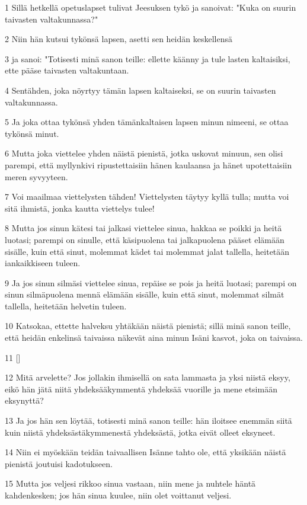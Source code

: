 \par 1 Sillä hetkellä opetuslapset tulivat Jeesuksen tykö ja sanoivat: "Kuka on suurin taivasten valtakunnassa?"
\par 2 Niin hän kutsui tykönsä lapsen, asetti sen heidän keskellensä
\par 3 ja sanoi: "Totisesti minä sanon teille: ellette käänny ja tule lasten kaltaisiksi, ette pääse taivasten valtakuntaan.
\par 4 Sentähden, joka nöyrtyy tämän lapsen kaltaiseksi, se on suurin taivasten valtakunnassa.
\par 5 Ja joka ottaa tykönsä yhden tämänkaltaisen lapsen minun nimeeni, se ottaa tykönsä minut.
\par 6 Mutta joka viettelee yhden näistä pienistä, jotka uskovat minuun, sen olisi parempi, että myllynkivi ripustettaisiin hänen kaulaansa ja hänet upotettaisiin meren syvyyteen.
\par 7 Voi maailmaa viettelysten tähden! Viettelysten täytyy kyllä tulla; mutta voi sitä ihmistä, jonka kautta viettelys tulee!
\par 8 Mutta jos sinun kätesi tai jalkasi viettelee sinua, hakkaa se poikki ja heitä luotasi; parempi on sinulle, että käsipuolena tai jalkapuolena pääset elämään sisälle, kuin että sinut, molemmat kädet tai molemmat jalat tallella, heitetään iankaikkiseen tuleen.
\par 9 Ja jos sinun silmäsi viettelee sinua, repäise se pois ja heitä luotasi; parempi on sinun silmäpuolena mennä elämään sisälle, kuin että sinut, molemmat silmät tallella, heitetään helvetin tuleen.
\par 10 Katsokaa, ettette halveksu yhtäkään näistä pienistä; sillä minä sanon teille, että heidän enkelinsä taivaissa näkevät aina minun Isäni kasvot, joka on taivaissa.
\par 11 []
\par 12 Mitä arvelette? Jos jollakin ihmisellä on sata lammasta ja yksi niistä eksyy, eikö hän jätä niitä yhdeksääkymmentä yhdeksää vuorille ja mene etsimään eksynyttä?
\par 13 Ja jos hän sen löytää, totisesti minä sanon teille: hän iloitsee enemmän siitä kuin niistä yhdeksästäkymmenestä yhdeksästä, jotka eivät olleet eksyneet.
\par 14 Niin ei myöskään teidän taivaallisen Isänne tahto ole, että yksikään näistä pienistä joutuisi kadotukseen.
\par 15 Mutta jos veljesi rikkoo sinua vastaan, niin mene ja nuhtele häntä kahdenkesken; jos hän sinua kuulee, niin olet voittanut veljesi.
